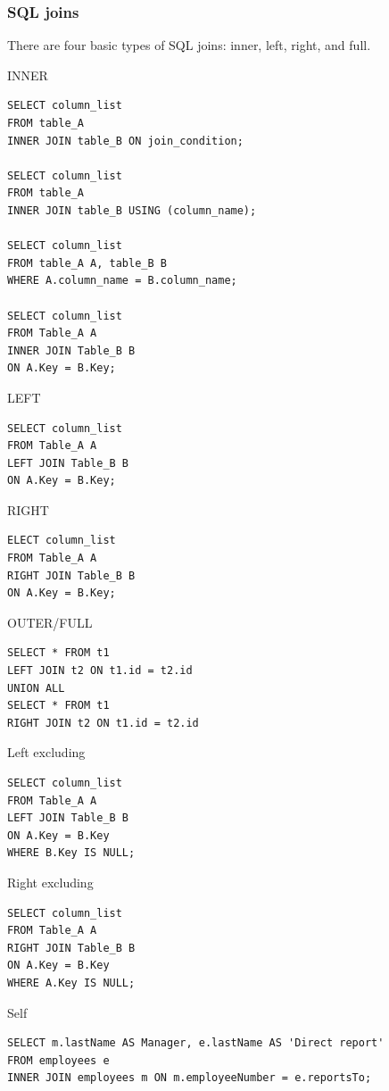 \subsubsection{SQL joins}

There are four basic types of SQL joins: inner, left, right, and
full.


\vspace{10pt}

INNER
\begin{verbatim}
SELECT column_list
FROM table_A
INNER JOIN table_B ON join_condition;

SELECT column_list
FROM table_A
INNER JOIN table_B USING (column_name);

SELECT column_list
FROM table_A A, table_B B
WHERE A.column_name = B.column_name;

SELECT column_list
FROM Table_A A
INNER JOIN Table_B B
ON A.Key = B.Key;
\end{verbatim}

LEFT

\begin{verbatim}
SELECT column_list
FROM Table_A A
LEFT JOIN Table_B B
ON A.Key = B.Key;
\end{verbatim}

RIGHT

\begin{verbatim}
ELECT column_list
FROM Table_A A
RIGHT JOIN Table_B B
ON A.Key = B.Key;
\end{verbatim}

OUTER/FULL

\begin{verbatim}
SELECT * FROM t1
LEFT JOIN t2 ON t1.id = t2.id
UNION ALL
SELECT * FROM t1
RIGHT JOIN t2 ON t1.id = t2.id
\end{verbatim}

Left excluding

\begin{verbatim}
SELECT column_list
FROM Table_A A
LEFT JOIN Table_B B
ON A.Key = B.Key
WHERE B.Key IS NULL;
\end{verbatim}

Right excluding

\begin{verbatim}
SELECT column_list
FROM Table_A A
RIGHT JOIN Table_B B
ON A.Key = B.Key
WHERE A.Key IS NULL;
\end{verbatim}

Self 

\begin{verbatim}
SELECT m.lastName AS Manager, e.lastName AS 'Direct report'
FROM employees e
INNER JOIN employees m ON m.employeeNumber = e.reportsTo;
\end{verbatim}

